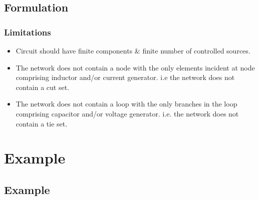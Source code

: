\documentclass{beamer}
\begin{document}
\subsection*{Formulation}

\begin{frame}
\frametitle{Limitations}

\begin{small}
       \begin{itemize}
          \item Circuit should have finite components \& finite number of controlled sources.
          \item The network does not contain a node with the only elements incident at node comprising
inductor and/or current generator. i.e the network does not contain a cut set.
          \item The network does not contain a loop with the only branches in the loop comprising capacitor
and/or voltage generator. i.e. the network does not contain a tie set.
       \end{itemize}
\end{small}
\end{frame}

\section{Example}
\subsection*{Example}
\end{document}
